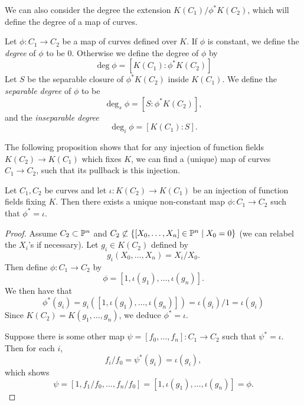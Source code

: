 We can also consider the degree the extension $K(C_1)/\phi^*K(C_2)$,
which will define the degree of a map of curves.

\begin{definition}
	Let $\phi: C_1 \to C_2$ be a map of curves defined over $K$.
	If $\phi$ is constant, we define the \emph{degree} of $\phi$ to be $0$.
	Otherwise we define the degree of $\phi$ by
	\begin{equation*}
		\deg\phi = [K(C_1): \phi^*K(C_2)]
	\end{equation*}
	Let $S$ be the separable closure of $\phi^*K(C_2)$ inside $K(C_1)$.
	We define the \emph{separable degree} of $\phi$ to be
	\begin{equation*}
		\deg_s\phi = [S: \phi^*K(C_2)],
	\end{equation*}
	and the \emph{inseparable degree}
	\begin{equation*}
		\deg_i\phi = [K(C_1): S].
	\end{equation*}
\end{definition}

The following proposition
shows that for any injection of function fields $K(C_2) \to K(C_1)$
which fixes $K$, we
can find a (unique)
map of curves $C_1 \to C_2$, such that its pullback is this
injection. 

\begin{proposition}
	\label{prop:existence-inclusion}
	Let $C_1, C_2$ be curves and
	let $\iota: K(C_2) \to K(C_1)$ be an injection of function fields
	fixing $K$. Then there exists a unique non-constant map $\phi: C_1 \to C_2$
	such that $\phi^* = \iota$.
\end{proposition}

\begin{proof}
	Assume $C_2 \subset \mathbb{P}^n$ and $C_2 \not\subset \{[X_0, \dots, X_n] \in
	\mathbb{P}^n \mid X_0 = 0\}$ (we can relabel the $X_i$'s if necessary).
	Let $g_i \in K(C_2)$ defined by 
	\begin{equation*}
		g_i(X_0, \dots, X_n) = X_i/X_0.
	\end{equation*}
	Then define $\phi: C_1 \to C_2$ by
	\begin{equation*}
		\phi = [1, \iota(g_1), \dots, \iota(g_n)].
	\end{equation*}
	We then have that
	\begin{equation*}
		\phi^*(g_i) = g_i\left([1, \iota(g_1), \dots, \iota(g_n)]\right)
		= \iota(g_i)/1 = \iota(g_i)
	\end{equation*}
	Since $K(C_2) = K(g_1, \dots, g_n)$, we deduce
	$\phi^* = \iota$.

	Suppose there is some other map $\psi = [f_0, \dots, f_n]: C_1 \to C_2$
	such that $\psi^* = \iota$. Then for each $i$,
	\begin{equation*}
		f_i/f_0 = \psi^*(g_i) = \iota(g_i),
	\end{equation*}
	which shows
	\begin{equation*}
		\psi = [1, f_1/f_0, \dots, f_n/f_0] = [1, \iota(g_1), \dots, \iota(g_n)]
		= \phi.
	\end{equation*}
\end{proof}

